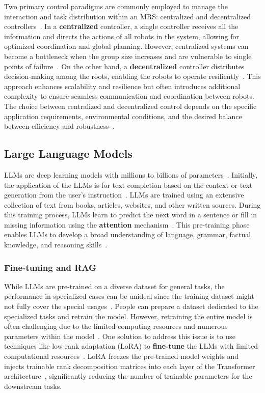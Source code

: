 Two primary control paradigms are commonly employed to manage the interaction and task distribution within an MRS: centralized and decentralized controllers~\cite{yan2013survey, cortes2017coordinated}. In a \textbf{centralized} controller, a single controller receives all the information and directs the actions of all robots in the system, allowing for optimized coordination and global planning. However, centralized systems can become a bottleneck when the group size increases and are vulnerable to single points of failure~\cite{luna2011efficient}. On the other hand, a \textbf{decentralized} controller distributes decision-making among the roots, enabling the robots to operate resiliently~\cite{rizk2019cooperative}. This approach enhances scalability and resilience but often introduces additional complexity to ensure seamless communication and coordination between robots. The choice between centralized and decentralized control depends on the specific application requirements, environmental conditions, and the desired balance between efficiency and robustness~\cite{yan2013survey}.

\subsection{Large Language Models}
LLMs are deep learning models with millions to billions of parameters~\cite{zeng_large_2023}. Initially, the application of the LLMs is for text completion based on the context or text generation from the user's instruction~\cite{zhao2023survey}. LLMs are trained using an extensive collection of text from books, articles, websites, and other written sources. During this training process, LLMs learn to predict the next word in a sentence or fill in missing information using the \textbf{attention} mechanism~\cite{vaswani2017attention}. This pre-training phase enables LLMs to develop a broad understanding of language, grammar, factual knowledge, and reasoning skills~\cite{naveed2023comprehensive}. 

\subsubsection{Fine-tuning and RAG}
While LLMs are pre-trained on a diverse dataset for general tasks, the performance in specialized cases can be unideal since the training dataset might not fully cover the special usages~\cite{ding2023parameter, ziegler2019fine}. People can prepare a dataset dedicated to the specialized tasks and retrain the model. However, retraining the entire model is often challenging due to the limited computing resources and numerous parameters within the model~\cite{ding2023parameter}. One solution to address this issue is to use techniques like low-rank adaptation (LoRA) to \textbf{fine-tune} the LLMs with limited computational resources~\cite{hu_lora_2021}. LoRA freezes the pre-trained model weights and injects trainable rank decomposition matrices into each layer of the Transformer architecture~\cite{vaswani2017attention}, significantly reducing the number of trainable parameters for the downstream tasks.

